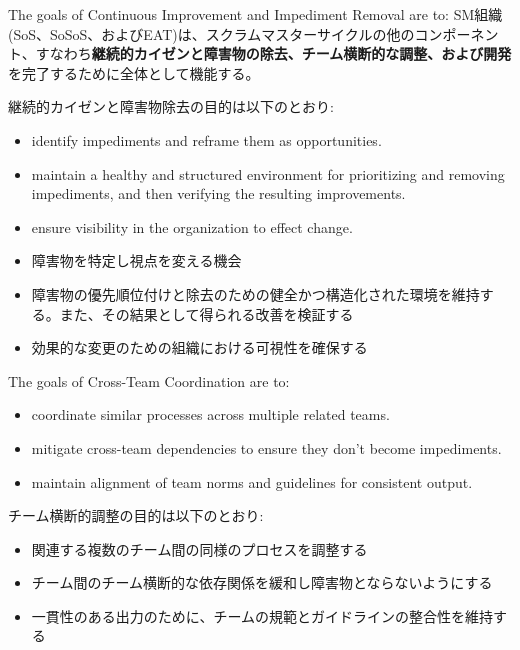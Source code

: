 \documentclass[12pt,a4paper,parskip=full]{scrartcl}
\begin{document}
The goals of Continuous Improvement and Impediment Removal are to:
\fi
SM組織(SoS、SoSoS、およびEAT)は、スクラムマスターサイクルの他のコンポーネント、すなわち\textbf{継続的カイゼンと障害物の除去、チーム横断的な調整、および開発}を完了するために全体として機能する。

継続的カイゼンと障害物除去の目的は以下のとおり:
\begin{itemize}
\item identify impediments and reframe them as opportunities.
\item maintain a healthy and structured environment for prioritizing and
removing impediments, and then verifying the resulting improvements.
\item ensure visibility in the organization to effect change.
\end{itemize}
\fi
\begin{itemize}
\item 障害物を特定し視点を変える機会
\item 障害物の優先順位付けと除去のための健全かつ構造化された環境を維持する。また、その結果として得られる改善を検証する
\item 効果的な変更のための組織における可視性を確保する
\end{itemize}
The goals of Cross-Team Coordination are to:
\begin{itemize}
\item coordinate similar processes across multiple related teams.
\item mitigate cross-team dependencies to ensure they don't become
impediments.
\item maintain alignment of team norms and guidelines for consistent output.
\end{itemize}
\fi
チーム横断的調整の目的は以下のとおり:
\begin{itemize}
\item 関連する複数のチーム間の同様のプロセスを調整する
\item チーム間のチーム横断的な依存関係を緩和し障害物とならないようにする
\item 一貫性のある出力のために、チームの規範とガイドラインの整合性を維持する
\end{itemize}
\end{document}
